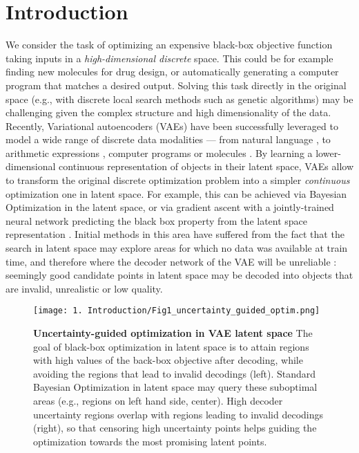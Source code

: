 \section{Introduction}
\label{Sec1_Intro}

We consider the task of optimizing an expensive black-box objective function taking inputs in a \emph{high-dimensional discrete} space. This could be for example finding new molecules for drug design, or automatically generating a computer program that matches a desired output. Solving this task directly in the original space (e.g., with discrete local search methods such as genetic algorithms) may be challenging given the complex structure and high dimensionality of the data.
Recently, Variational autoencoders (VAEs) \citep{kingma2014autoencoding,rezende2014stochastic} have been successfully leveraged to model a wide range of discrete data modalities --- from natural language \citep{bowman2016generating}, to arithmetic expressions \citep{kusner2017grammar}, computer programs \citep{dai2018syntaxdirected} or molecules \citep{Gomez_Bombarelli_2018}. By learning a lower-dimensional continuous representation of objects in their latent space, VAEs allow to transform the original discrete optimization problem into a simpler \emph{continuous} optimization one in latent space. For example, this can be achieved via Bayesian Optimization in the latent space, or via gradient ascent with a jointly-trained neural network predicting the black box property from the latent space representation \citep{Gomez_Bombarelli_2018, bradshaw2019model}.
Initial methods in this area have suffered from the fact that the search in latent space may explore areas for which no data was available at train time, and therefore where the decoder network of the VAE will be unreliable \citep{janz2017actively}: seemingly good candidate points in latent space may be decoded into objects that are invalid, unrealistic or low quality.

\begin{figure*}[h]
    \centering
    \texttt{[image: 1. Introduction/Fig1\_uncertainty\_guided\_optim.png]}
    \caption{\textbf{Uncertainty-guided optimization in VAE latent space} The goal of black-box optimization in latent space is to attain regions with high values of the back-box objective after decoding, while avoiding the regions that lead to invalid decodings (left). Standard Bayesian Optimization in latent space may query these suboptimal areas (e.g., regions on left hand side, center). High decoder uncertainty regions overlap with regions leading to invalid decodings (right), so that censoring high uncertainty points helps guiding the optimization towards the most promising latent points.}
    \label{Sec1_Fig1}
\end{figure*}

